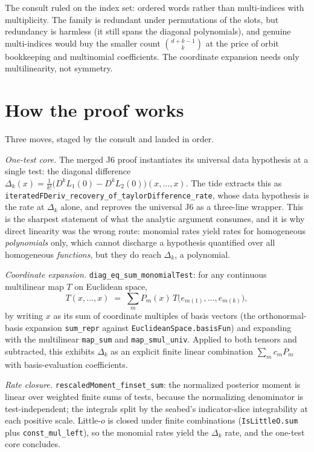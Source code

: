 \documentclass[11pt]{article}
\newcommand{\code}[1]{\texttt{#1}}
\begin{document}
The consult ruled on the index set: ordered words rather than
multi-indices with multiplicity. The family is redundant under
permutations of the slots, but redundancy is harmless (it still spans
the diagonal polynomials), and genuine multi-indices would buy the
smaller count $\binom{d+k-1}{k}$ at the price of orbit bookkeeping
and multinomial coefficients. The coordinate expansion needs only
multilinearity, not symmetry.

\section{How the proof works}

Three moves, staged by the consult and landed in order.

\emph{One-test core.} The merged J6 proof instantiates its universal
data hypothesis at a single test: the diagonal difference
$\Delta_k(x) = \frac{1}{k!}\bigl(D^k L_1(0) - D^k L_2(0)\bigr)
(x, \dots, x)$. The tide extracts this as\\
\code{iteratedFDeriv\_recovery\_of\_taylorDifference\_rate}, whose
data hypothesis is the rate at $\Delta_k$ alone, and
reproves the universal J6 as a three-line wrapper. This is the
sharpest statement of what the analytic argument consumes, and it
is why direct linearity was the wrong route: monomial rates yield
rates for homogeneous \emph{polynomials} only, which cannot
discharge a hypothesis quantified over all homogeneous
\emph{functions}, but they do reach $\Delta_k$, a polynomial.

\emph{Coordinate expansion.} \code{diag\_eq\_sum\_monomialTest}:
for any continuous multilinear map $T$ on Euclidean space,
\[
  T(x, \dots, x) \;=\; \sum_{m} P_m(x)\,
  T\bigl(e_{m(1)}, \dots, e_{m(k)}\bigr),
\]
by writing $x$ as its sum of coordinate multiples of basis vectors
(the orthonormal-basis expansion \code{sum\_repr} against
\code{EuclideanSpace.basisFun}) and expanding with the multilinear
\code{map\_sum} and \code{map\_smul\_univ}. Applied to both tensors
and subtracted, this
exhibits $\Delta_k$ as an explicit finite linear combination
$\sum_m c_m P_m$ with basis-evaluation coefficients.

\emph{Rate closure.} \code{rescaledMoment\_finset\_sum}: the
normalized posterior moment is linear over weighted finite sums of
tests, because the normalizing denominator is test-independent; the
integrals split by the seabed's indicator-slice integrability at
each positive scale. Little-$o$ is closed under finite combinations
(\code{IsLittleO.sum} plus \code{const\_mul\_left}), so the monomial
rates yield the $\Delta_k$ rate, and the one-test core concludes.
\end{document}
